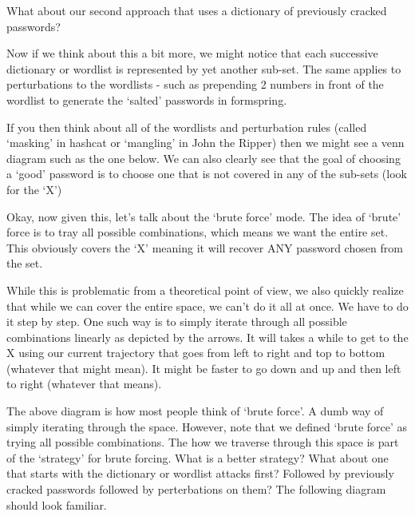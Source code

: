 What about our second approach that uses a dictionary of previously cracked passwords?

Now if we think about this a bit more, we might notice that each successive dictionary or wordlist is represented by yet another sub-set. The same applies to perturbations to the wordlists - such as prepending 2 numbers in front of the wordlist to generate the ‘salted’ passwords in formspring.

If you then think about all of the wordlists and perturbation rules (called ‘masking’ in hashcat or ‘mangling’ in John the Ripper) then we might see a venn diagram such as the one below. We can also clearly see that the goal of choosing a ‘good’ password is to choose one that is not covered in any of the sub-sets (look for the ‘X’)

Okay, now given this, let’s talk about the ‘brute force’ mode. The idea of ‘brute’ force is to tray all possible combinations, which means we want the entire set. This obviously covers the ‘X’ meaning it will recover ANY password chosen from the set.

While this is problematic from a theoretical point of view, we also quickly realize that while we can cover the entire space, we can’t do it all at once. We have to do it step by step. One such way is to simply iterate through all possible combinations linearly as depicted by the arrows. It will takes a while to get to the X using our current trajectory that goes from left to right and top to bottom (whatever that might mean). It might be faster to go down and up and then left to right (whatever that means).

The above diagram is how most people think of ‘brute force’. A dumb way of simply iterating through the space. However, note that we defined ‘brute force’ as trying all possible combinations. The how we traverse through this space is part of the ‘strategy’ for brute forcing. What is a better strategy? What about one that starts with the dictionary or wordlist attacks first? Followed by previously cracked passwords followed by perterbations on them? The following diagram should look familiar.

